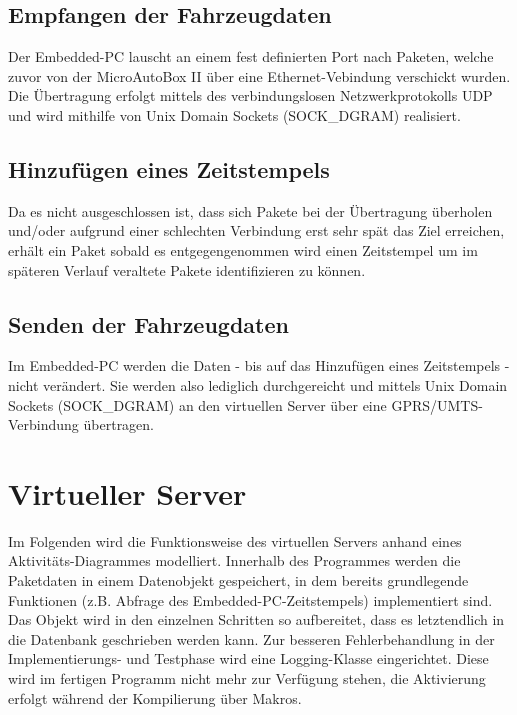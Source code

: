 \documentclass[fontsize = 12pt, paper = a4]{scrreprt}
\begin{document}
\subsection{Empfangen der Fahrzeugdaten}

Der Embedded-PC lauscht an einem fest definierten Port nach Paketen, welche zuvor von der MicroAutoBox II über eine Ethernet-Vebindung verschickt wurden. Die Übertragung erfolgt mittels des verbindungslosen Netzwerkprotokolls UDP und wird mithilfe von Unix Domain Sockets (SOCK\_DGRAM) realisiert. 

\subsection{Hinzufügen eines Zeitstempels}

Da es nicht ausgeschlossen ist, dass sich Pakete bei der Übertragung überholen und/oder aufgrund einer schlechten Verbindung erst sehr spät das Ziel erreichen, erhält ein Paket sobald es entgegengenommen wird einen Zeitstempel um im späteren Verlauf veraltete Pakete identifizieren zu können. 

\subsection{Senden der Fahrzeugdaten}

Im Embedded-PC werden die Daten - bis auf das Hinzufügen eines Zeitstempels - nicht verändert. Sie werden also lediglich durchgereicht und mittels Unix Domain Sockets (SOCK\_DGRAM) an den virtuellen Server über eine GPRS/UMTS-Verbindung übertragen. 

\section{Virtueller Server}

Im Folgenden wird die Funktionsweise des virtuellen Servers anhand eines Aktivitäts-Diagrammes modelliert. Innerhalb des Programmes werden die Paketdaten in einem Datenobjekt gespeichert, in dem bereits grundlegende Funktionen (z.B. Abfrage des Embedded-PC-Zeitstempels) implementiert sind. Das Objekt wird in den einzelnen Schritten so aufbereitet, dass es letztendlich in die Datenbank geschrieben werden kann. Zur besseren Fehlerbehandlung in der Implementierungs- und Testphase wird eine Logging-Klasse eingerichtet. Diese wird im fertigen Programm nicht mehr zur Verfügung stehen, die Aktivierung erfolgt während der Kompilierung über Makros. \\
\end{document}
